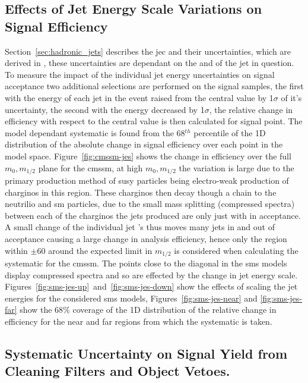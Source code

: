 \subsection{Effects of Jet Energy Scale Variations on Signal Efficiency} 
\label{sub:effects_of_jet_energy_scale_on_signal_efficiency}
Section~\ref{sec:hadronic_jets} describes the \ac{jec} and their uncertainties, 
which are derived in \cite{}, these uncertainties are dependant on the \mETA 
and \ET of the jet in question. To measure the impact of the individual jet 
energy uncertainties on signal acceptance two additional selections are 
performed on the signal samples, the first with the energy of each jet in the 
event raised from the central value by 1$\sigma$ of it's uncertainty, the 
second with the energy decreased by 1$\sigma$, the relative change in 
efficiency with respect to the central value is then calculated for signal 
point. The model dependant systematic is found from the 68$^{th}$ percentile of 
the 1D distribution of the absolute change in signal efficiency over each point 
in the model space. Figure~\ref{fig:cmssm-jes} shows the change in efficiency 
over the full $m_{0}, m_{1/2}$ plane for the \ac{cmssm}, at high $m_{0}, 
m_{1/2}$ the variation is large due to the primary production method of 
\ac{susy} particles being electro-weak production of charginos in this region. 
These charginos then decay though a chain to the neutrilio and \ac{sm} 
particles, due to the small mass splitting (compressed spectra) between each of 
the charginos the jets produced are only just with in \ET acceptance. A small 
change of the individual jet \ET's thus moves many jets in and out of 
acceptance causing a large change in analysis efficiency, hence only the region 
within $\pm$\unit{60}{\GeV} around the expected limit in $m_{1/2}$ is 
considered when calculating the systematic for the \ac{cmssm}. The points close 
to the diagonal in the \ac{sms} models display compressed spectra and so are 
effected by the change in jet energy scale. 
Figures~\ref{fig:sms-jes-up}~and~\ref{fig:sms-jes-down} show the effects of 
scaling the jet energies for the considered \ac{sms} models, 
Figures~\ref{fig:sms-jes-near} and \ref{fig:sms-jes-far} show the 68$\%$ 
coverage of the 1D distribution of the relative change in efficiency for the 
near and far regions from which the systematic is taken.

\subsection{Systematic Uncertainty on Signal Yield from Cleaning Filters and Object Vetoes.} %
\label{sub:systematic_uncertainty_on_signal_yield_from_cleaning_filters_and_object_vetoes_}

